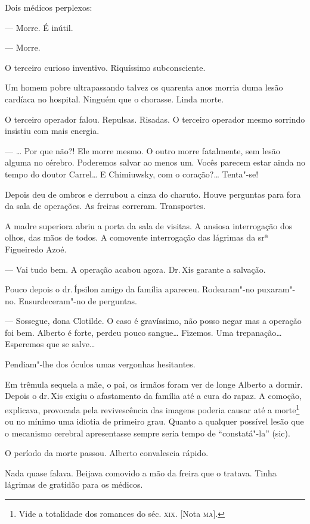 Dois médicos perplexos:

--- Morre. É inútil.

--- Morre.

O terceiro curioso inventivo. Riquíssimo subconsciente.

Um homem pobre ultrapassando talvez os quarenta anos morria duma lesão
cardíaca no hospital. Ninguém que o chorasse. Linda morte.

O terceiro operador falou. Repulsas. Risadas. O terceiro operador mesmo
sorrindo insistiu com mais energia.

--- \ldots{} Por que não?! Ele morre mesmo. O outro morre fatalmente, sem
lesão alguma no cérebro. Poderemos salvar ao menos um. Vocês parecem
estar ainda no tempo do doutor Carrel\ldots{} E Chimiuwsky, com o coração?\ldots{}
Tenta"-se!

Depois deu de ombros e derrubou a cinza do charuto. Houve perguntas para
fora da sala de operações. As freiras correram. Transportes.

A madre superiora abriu a porta da sala de visitas. A ansiosa
interrogação dos olhos, das mãos de todos. A comovente interrogação das
lágrimas da srª Figueiredo Azoé.

--- Vai tudo bem. A operação acabou agora. Dr.\,Xis garante a salvação.

Pouco depois o dr.\,Ípsilon amigo da família apareceu. Rodearam"-no
puxaram"-no. Ensurdeceram"-no de perguntas.

--- Sossegue, dona Clotilde. O caso é gravíssimo, não posso negar mas a
operação foi bem. Alberto é forte, perdeu pouco sangue\ldots{} Fizemos. Uma
trepanação\ldots{} Esperemos que se salve\ldots{}

Pendiam"-lhe dos óculos umas vergonhas hesitantes.

Em trêmula sequela a mãe, o pai, os irmãos foram ver de longe Alberto a
dormir. Depois o dr.\,Xis exigiu o afastamento da família até a cura do
rapaz. A comoção, explicava, provocada pela revivescência das imagens
poderia causar até a morte\footnote{Vide a totalidade dos romances do
  séc. \textsc{xix}. {[}Nota \textsc{ma}{]}.} ou no mínimo uma idiotia de primeiro grau.
Quanto a qualquer possível lesão que o mecanismo cerebral apresentasse
sempre seria tempo de ``constatá"-la'' (sic).

O período da morte passou. Alberto convalescia rápido.

Nada quase falava. Beijava comovido a mão da freira que o tratava. Tinha
lágrimas de gratidão para os médicos.

